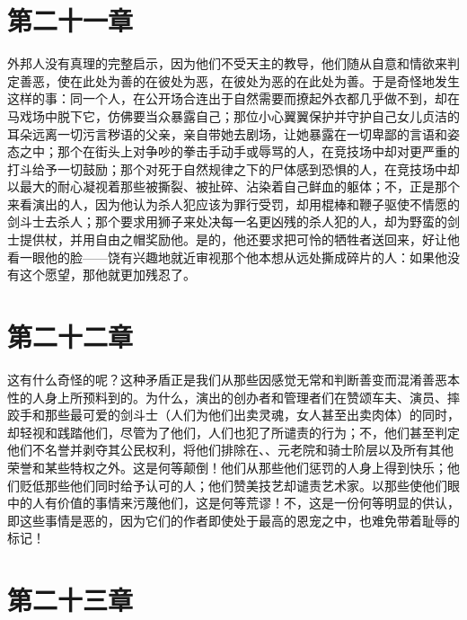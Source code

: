 
\section{第二十一章}

外邦人没有真理的完整启示，因为他们不受天主的教导，他们随从自意和情欲来判定善恶，使在此处为善的在彼处为恶，在彼处为恶的在此处为善。于是奇怪地发生这样的事：同一个人，在公开场合连出于自然需要而撩起外衣都几乎做不到，却在马戏场中脱下它，仿佛要当众暴露自己；那位小心翼翼保护并守护自己女儿贞洁的耳朵远离一切污言秽语的父亲，亲自带她去剧场，让她暴露在一切卑鄙的言语和姿态之中；那个在街头上对争吵的拳击手动手或辱骂的人，在竞技场中却对更严重的打斗给予一切鼓励；那个对死于自然规律之下的尸体感到恐惧的人，在竞技场中却以最大的耐心凝视着那些被撕裂、被扯碎、沾染着自己鲜血的躯体；不，正是那个来看演出的人，因为他认为杀人犯应该为罪行受罚，却用棍棒和鞭子驱使不情愿的剑斗士去杀人；那个要求用狮子来处决每一名更凶残的杀人犯的人，却为野蛮的剑士提供杖，并用自由之帽奖励他。是的，他还要求把可怜的牺牲者送回来，好让他看一眼他的脸——饶有兴趣地就近审视那个他本想从远处撕成碎片的人：如果他没有这个愿望，那他就更加残忍了。\par


\section{第二十二章}

这有什么奇怪的呢？这种矛盾正是我们从那些因感觉无常和判断善变而混淆善恶本性的人身上所预料到的。为什么，演出的创办者和管理者们在赞颂车夫、演员、摔跤手和那些最可爱的剑斗士（人们为他们出卖灵魂，女人甚至出卖肉体）的同时，却轻视和践踏他们，尽管为了他们，人们也犯了所谴责的行为；不，他们甚至判定他们不名誉并剥夺其公民权利，将他们排除在、、元老院和骑士阶层以及所有其他荣誉和某些特权之外。这是何等颠倒！他们从那些他们惩罚的人身上得到快乐；他们贬低那些他们同时给予认可的人；他们赞美技艺却谴责艺术家。以那些使他们眼中的人有价值的事情来污蔑他们，这是何等荒谬！不，这是一份何等明显的供认，即这些事情是恶的，因为它们的作者即使处于最高的恩宠之中，也难免带着耻辱的标记！\par


\section{第二十三章}

